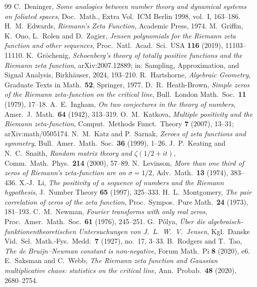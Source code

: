 \documentclass[11pt]{amsart}
\theoremstyle{definition}
\theoremstyle{remark}
\begin{document}
\begin{thebibliography}{99}
 C.~Deninger, \emph{Some analogies between number theory and dynamical systems on foliated spaces}, Doc.\ Math., Extra Vol.\ ICM Berlin 1998, vol.~I, 163--186.
 H.~M.~Edwards, \emph{Riemann's Zeta Function}, Academic Press, 1974.
 M.~Griffin, K.~Ono, L.~Rolen and D.~Zagier, \emph{Jensen polynomials for the Riemann zeta function and other sequences}, Proc.\ Natl.\ Acad.\ Sci.\ USA \textbf{116} (2019), 11103--11110.
 K.~Gr\"ochenig, \emph{Schoenberg's theory of totally positive functions and the Riemann zeta function}, arXiv:2007.12889; in: Sampling, Approximation, and Signal Analysis, Birkh\"auser, 2024, 193--210.
 R.~Hartshorne, \emph{Algebraic Geometry}, Graduate Texts in Math.\ \textbf{52}, Springer, 1977.
 D.~R.~Heath-Brown, \emph{Simple zeros of the Riemann zeta-function on the critical line}, Bull.\ London Math.\ Soc.\ \textbf{11} (1979), 17--18.
 A.~E.~Ingham, \emph{On two conjectures in the theory of numbers}, Amer.\ J.\ Math.\ \textbf{64} (1942), 313--319.
 O.~M.~Katkova, \emph{Multiple positivity and the Riemann zeta-function}, Comput.\ Methods Funct.\ Theory \textbf{7} (2007), 13--31; arXiv:math/0505174.
 N.~M.~Katz and P.~Sarnak, \emph{Zeroes of zeta functions and symmetry}, Bull.\ Amer.\ Math.\ Soc.\ \textbf{36} (1999), 1--26.
 J.~P.~Keating and N.~C.~Snaith, \emph{Random matrix theory and $\zeta(1/2+it)$}, Comm.\ Math.\ Phys.\ \textbf{214} (2000), 57--89.
 N.~Levinson, \emph{More than one third of zeros of Riemann's zeta-function are on $\sigma=1/2$}, Adv.\ Math.\ \textbf{13} (1974), 383--436.
 X.-J.~Li, \emph{The positivity of a sequence of numbers and the Riemann hypothesis}, J.\ Number Theory \textbf{65} (1997), 325--333.
 H.~L.~Montgomery, \emph{The pair correlation of zeros of the zeta function}, Proc.\ Sympos.\ Pure Math.\ \textbf{24} (1973), 181--193.
 C.~M.~Newman, \emph{Fourier transforms with only real zeros}, Proc.\ Amer.\ Math.\ Soc.\ \textbf{61} (1976), 245--251.
 G.~P\'olya, \emph{\"Uber die algebraisch-funktionentheoretischen Untersuchungen von J.~L.~W.~V.~Jensen}, Kgl.\ Danske Vid.\ Sel.\ Math.-Fys.\ Medd.\ \textbf{7} (1927), no.~17, 3--33.
 B.~Rodgers and T.~Tao, \emph{The de Bruijn--Newman constant is non-negative}, Forum Math.\ Pi \textbf{8} (2020), e6.
 E.~Saksman and C.~Webb, \emph{The Riemann zeta function and Gaussian multiplicative chaos: statistics on the critical line}, Ann.\ Probab.\ \textbf{48} (2020), 2680--2754.

\end{thebibliography}
\end{document}
